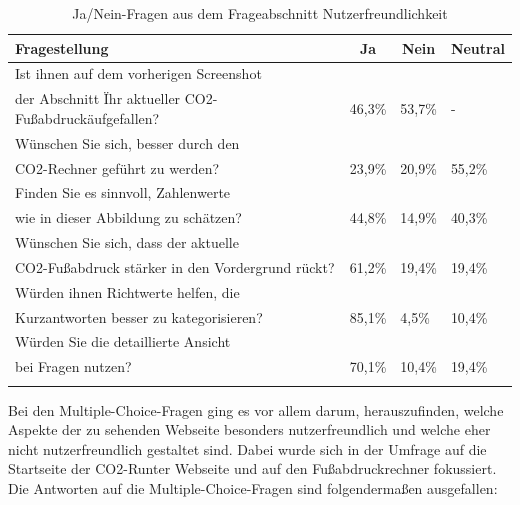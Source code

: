 \begin{longtable}{@{\extracolsep{\fill}}|l|l|l|l@{}}
    \hline
    \multicolumn{1}{|l|}{\textbf{Fragestellung}} &
    \multicolumn{1}{c|}{\textbf{Ja}}             &
    \multicolumn{1}{c|}{\textbf{Nein}}           &
    \multicolumn{1}{r|}{\textbf{Neutral}}          \\ \hline
    \endfirsthead

    Ist ihnen auf dem vorherigen Screenshot        \\der Abschnitt \"Ihr aktueller CO2-Fußabdruck\" aufgefallen?& 46,3\% & 53,7\% & - \\ \hline
    Wünschen Sie sich, besser durch den            \\CO2-Rechner geführt zu werden?& 23,9\% & 20,9\% & 55,2\%  \\ \hline
    Finden Sie es sinnvoll, Zahlenwerte            \\wie in dieser Abbildung zu schätzen?& 44,8\% & 14,9\% & 40,3\%  \\ \hline
    Wünschen Sie sich, dass der aktuelle           \\CO2-Fußabdruck stärker in den Vordergrund rückt?& 61,2\% & 19,4\% & 19,4\%  \\ \hline
    Würden ihnen Richtwerte helfen, die            \\Kurzantworten besser zu kategorisieren?& 85,1\% & 4,5\% & 10,4\%  \\ \hline
    Würden Sie die detaillierte Ansicht            \\ bei Fragen nutzen?& 70,1\% & 10,4\% & 19,4\%  \\ \hline
    \caption{Ja/Nein-Fragen aus dem Frageabschnitt Nutzerfreundlichkeit}
    \label{nutzerfreundlichkeitFragen}
    \\
\end{longtable}

Bei den Multiple-Choice-Fragen ging es vor allem darum, herauszufinden, welche Aspekte der zu sehenden Webseite besonders nutzerfreundlich und welche eher nicht nutzerfreundlich gestaltet sind.
Dabei wurde sich in der Umfrage auf die Startseite der CO2-Runter Webseite und auf den Fußabdruckrechner fokussiert.
Die Antworten auf die Multiple-Choice-Fragen sind folgendermaßen ausgefallen:

